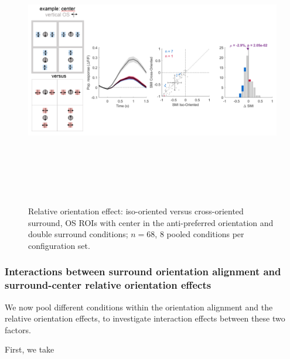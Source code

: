 \begin{figure}[H] \centering \includegraphics[width=12cm,height=12cm,keepaspectratio]{Figures/7.Results/finalPopulation/sel/diagrams/9.png} 
\caption{Relative orientation effect: iso-oriented versus cross-oriented surround, OS ROIs with center in the anti-preferred orientation and double surround conditions;  $n=68$, 8 pooled conditions per configuration set.} \label{9} 
\end{figure}

\subsubsection{Interactions between surround orientation alignment and surround-center relative orientation effects}

We now pool different conditions within the orientation alignment and the relative orientation effects, to investigate interaction effects between these two factors.

First, we take

